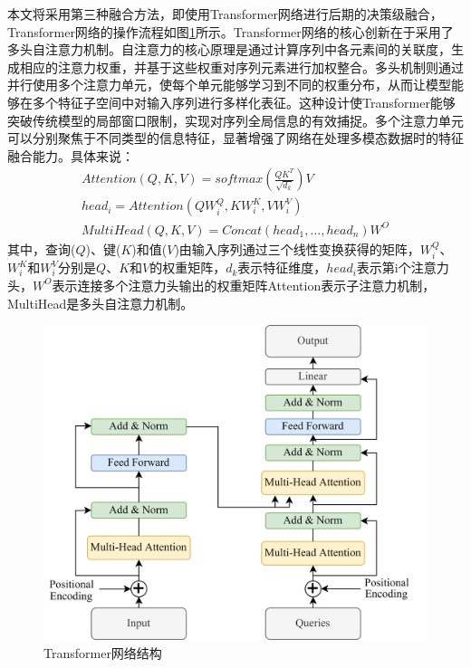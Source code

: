 本文将采用第三种融合方法，即使用Transformer网络进行后期的决策级融合，Transformer网络的操作流程如图\ref{ftransformer}所示。Transformer网络的核心创新在于采用了多头自注意力机制\cite{niu2021review}。自注意力的核心原理是通过计算序列中各元素间的关联度，生成相应的注意力权重，并基于这些权重对序列元素进行加权整合。多头机制则通过并行使用多个注意力单元，使每个单元能够学习到不同的权重分布，从而让模型能够在多个特征子空间中对输入序列进行多样化表征。这种设计使Transformer能够突破传统模型的局部窗口限制，实现对序列全局信息的有效捕捉。多个注意力单元可以分别聚焦于不同类型的信息特征，显著增强了网络在处理多模态数据时的特征融合能力。具体来说：
\begin{equation}
    \begin{array}{c}
Attention\left( {Q,K,V} \right) = softmax\left( {\frac{{Q{K^T}}}{{\sqrt {{d_k}} }}} \right)V\\
hea{d_i} = Attention\left( {QW_i^Q,KW_i^K,VW_i^V} \right)\\
MultiHead\left( {Q,K,V} \right) = Concat\left( {hea{d_1}, \ldots ,hea{d_n}} \right){W^O}
\end{array}
    \label{myeq7}
\end{equation}
其中，查询($Q$)、键($K$)和值($V$)由输入序列通过三个线性变换获得的矩阵，$W_i^Q$、$W_i^K$和$W_i^V$分别是$Q$、$K$和$V$的权重矩阵，${d_k}$表示特征维度，$hea{d_i}$表示第i个注意力头，${W^O}$表示连接多个注意力头输出的权重矩阵Attention表示子注意力机制，MultiHead是多头自注意力机制。
\begin{figure}[htbp]
    \centering
    \includegraphics[scale=0.10]{Fig/transformer.png}
    \caption{\label{ftransformer}Transformer网络结构}
\end{figure}

